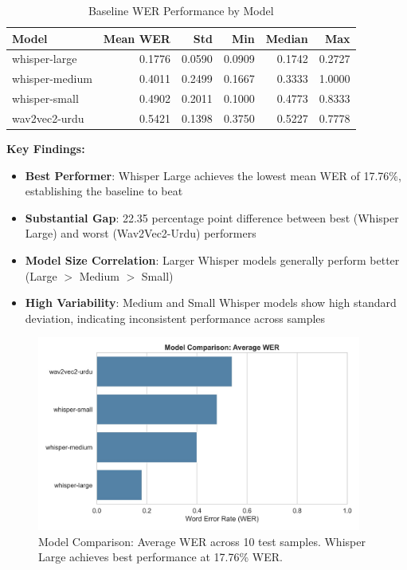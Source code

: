 \begin{table}[H]
\centering
\caption{Baseline WER Performance by Model}
\label{tab:baseline_wer}
\begin{tabular}{lrrrrr}
\toprule
\textbf{Model} & \textbf{Mean WER} & \textbf{Std} & \textbf{Min} & \textbf{Median} & \textbf{Max} \\
\midrule
whisper-large  & 0.1776 & 0.0590 & 0.0909 & 0.1742 & 0.2727 \\
whisper-medium & 0.4011 & 0.2499 & 0.1667 & 0.3333 & 1.0000 \\
whisper-small  & 0.4902 & 0.2011 & 0.1000 & 0.4773 & 0.8333 \\
wav2vec2-urdu  & 0.5421 & 0.1398 & 0.3750 & 0.5227 & 0.7778 \\
\bottomrule
\end{tabular}
\end{table}

\textbf{Key Findings:}

\begin{itemize}
    \item \textbf{Best Performer}: Whisper Large achieves the lowest mean WER of 17.76\%, establishing the baseline to beat
    \item \textbf{Substantial Gap}: 22.35 percentage point difference between best (Whisper Large) and worst (Wav2Vec2-Urdu) performers
    \item \textbf{Model Size Correlation}: Larger Whisper models generally perform better (Large $>$ Medium $>$ Small)
    \item \textbf{High Variability}: Medium and Small Whisper models show high standard deviation, indicating inconsistent performance across samples
\end{itemize}

\begin{figure}[H]
    \centering
    \includegraphics[width=0.95\textwidth]{ThesisFigs/wer_comparison.jpg}
    \caption{Model Comparison: Average WER across 10 test samples. Whisper Large achieves best performance at 17.76\% WER.}
    \label{fig:wer_comparison}
\end{figure}

